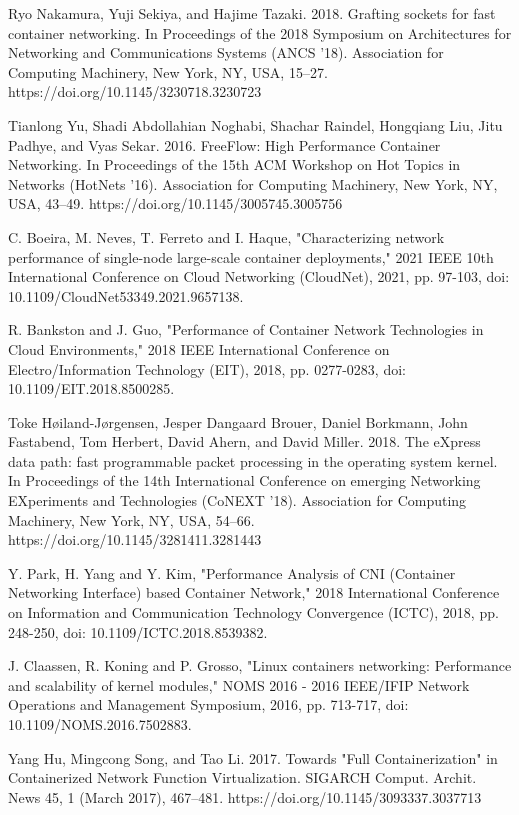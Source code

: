 \documentclass[conference]{IEEEtran}
\begin{document}
\begin{thebibliography}{1}
Ryo Nakamura, Yuji Sekiya, and Hajime Tazaki. 2018. Grafting sockets for fast container networking. In Proceedings of the 2018 Symposium on Architectures for Networking and Communications Systems (ANCS '18). Association for Computing Machinery, New York, NY, USA, 15–27. https://doi.org/10.1145/3230718.3230723

Tianlong Yu, Shadi Abdollahian Noghabi, Shachar Raindel, Hongqiang Liu, Jitu Padhye, and Vyas Sekar. 2016. FreeFlow: High Performance Container Networking. In Proceedings of the 15th ACM Workshop on Hot Topics in Networks (HotNets '16). Association for Computing Machinery, New York, NY, USA, 43–49. https://doi.org/10.1145/3005745.3005756


C. Boeira, M. Neves, T. Ferreto and I. Haque, "Characterizing network performance of single-node large-scale container deployments," 2021 IEEE 10th International Conference on Cloud Networking (CloudNet), 2021, pp. 97-103, doi: 10.1109/CloudNet53349.2021.9657138.

R. Bankston and J. Guo, "Performance of Container Network Technologies in Cloud Environments," 2018 IEEE International Conference on Electro/Information Technology (EIT), 2018, pp. 0277-0283, doi: 10.1109/EIT.2018.8500285.

Toke Høiland-Jørgensen, Jesper Dangaard Brouer, Daniel Borkmann, John Fastabend, Tom Herbert, David Ahern, and David Miller. 2018. The eXpress data path: fast programmable packet processing in the operating system kernel. In Proceedings of the 14th International Conference on emerging Networking EXperiments and Technologies (CoNEXT '18). Association for Computing Machinery, New York, NY, USA, 54–66. https://doi.org/10.1145/3281411.3281443

Y. Park, H. Yang and Y. Kim, "Performance Analysis of CNI (Container Networking Interface) based Container Network," 2018 International Conference on Information and Communication Technology Convergence (ICTC), 2018, pp. 248-250, doi: 10.1109/ICTC.2018.8539382.

J. Claassen, R. Koning and P. Grosso, "Linux containers networking: Performance and scalability of kernel modules," NOMS 2016 - 2016 IEEE/IFIP Network Operations and Management Symposium, 2016, pp. 713-717, doi: 10.1109/NOMS.2016.7502883.

Yang Hu, Mingcong Song, and Tao Li. 2017. Towards "Full Containerization" in Containerized Network Function Virtualization. SIGARCH Comput. Archit. News 45, 1 (March 2017), 467–481. https://doi.org/10.1145/3093337.3037713


\end{thebibliography}
\end{document}
